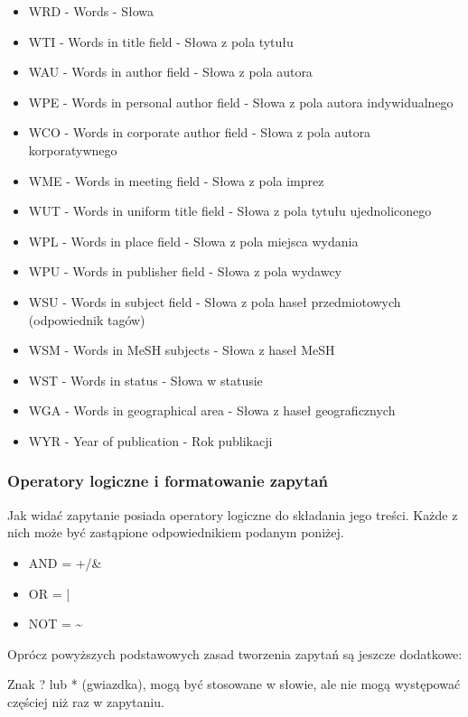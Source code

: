 \documentclass{report}
\begin{document}
				\begin{itemize}
					\item WRD - Words - Słowa
					\item WTI - Words in title field - Słowa z pola tytułu
					\item WAU - Words in author field - Słowa z pola autora
					\item WPE - Words in personal author field - Słowa z pola autora indywidualnego
					\item WCO - Words in corporate author field - Słowa z pola autora korporatywnego
					\item WME - Words in meeting field - Słowa z pola imprez
					\item WUT - Words in uniform title field - Słowa z pola tytułu ujednoliconego
					\item WPL - Words in place field - Słowa z pola miejsca wydania
					\item WPU - Words in publisher field - Słowa z pola wydawcy
					\item WSU - Words in subject field - Słowa z pola haseł przedmiotowych (odpowiednik tagów)
					\item WSM - Words in MeSH subjects - Słowa z haseł MeSH
					\item WST - Words in status - Słowa w statusie
					\item WGA - Words in geographical area - Słowa z haseł geograficznych
					\item WYR - Year of publication - Rok publikacji 
				\end{itemize}
		
			\subsubsection{Operatory logiczne i formatowanie zapytań}
			
				Jak widać zapytanie posiada operatory logiczne do składania jego treści. Każde z nich może być zastąpione odpowiednikiem podanym poniżej.
				
				\begin{itemize}
					\item AND = +/\&
					\item OR = |
					\item NOT = \textasciitilde
				\end{itemize}
				
				Oprócz powyższych podstawowych zasad tworzenia zapytań są jeszcze dodatkowe:
				
				Znak ? lub * (gwiazdka), mogą być stosowane w słowie, ale nie mogą występować częściej niż raz w zapytaniu.
				
\end{document}
